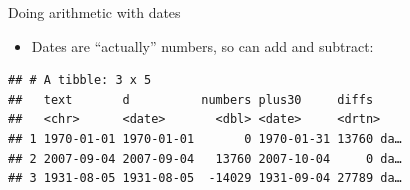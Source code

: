 \documentclass[
  ignorenonframetext,
]{beamer}
\newenvironment{Shaded}{\begin{snugshade}}{\end{snugshade}}
\newcommand{\DataTypeTok}[1]{\textcolor[rgb]{0.13,0.29,0.53}{#1}}
\newcommand{\DecValTok}[1]{\textcolor[rgb]{0.00,0.00,0.81}{#1}}
\newcommand{\KeywordTok}[1]{\textcolor[rgb]{0.13,0.29,0.53}{\textbf{#1}}}
\newcommand{\NormalTok}[1]{#1}
\newcommand{\OperatorTok}[1]{\textcolor[rgb]{0.81,0.36,0.00}{\textbf{#1}}}
\newcommand{\StringTok}[1]{\textcolor[rgb]{0.31,0.60,0.02}{#1}}
\providecommand{\tightlist}{%
  \setlength{\itemsep}{0pt}\setlength{\parskip}{0pt}}
\begin{document}
\begin{frame}[fragile]{Doing arithmetic with dates}
\protect\hypertarget{doing-arithmetic-with-dates}{}

\begin{itemize}
\tightlist
\item
  Dates are ``actually'' numbers, so can add and subtract:
\end{itemize}

\begin{Shaded}
\end{Shaded}

\begin{verbatim}
## # A tibble: 3 x 5
##   text       d          numbers plus30     diffs    
##   <chr>      <date>       <dbl> <date>     <drtn>   
## 1 1970-01-01 1970-01-01       0 1970-01-31 13760 da…
## 2 2007-09-04 2007-09-04   13760 2007-10-04     0 da…
## 3 1931-08-05 1931-08-05  -14029 1931-09-04 27789 da…
\end{verbatim}

\end{frame}
\end{document}

